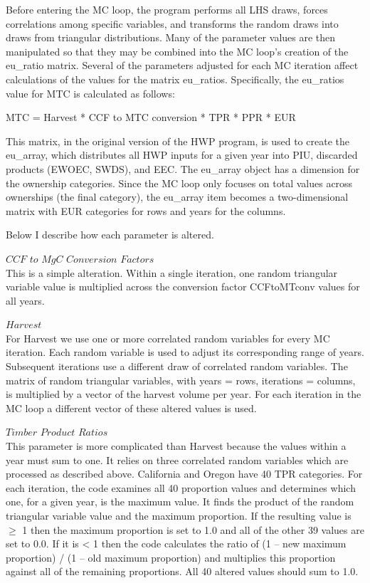 \documentclass[
  openany]{book}
\begin{document}
Before entering the MC loop, the program performs all LHS draws, forces
correlations among specific variables, and transforms the random draws
into draws from triangular distributions. Many of the parameter values
are then manipulated so that they may be combined into the MC loop's
creation of the eu\_ratio matrix. Several of the parameters adjusted for
each MC iteration affect calculations of the values for the matrix
eu\_ratios. Specifically, the eu\_ratios value for MTC is calculated as
follows:

MTC = Harvest * CCF to MTC conversion * TPR * PPR * EUR

This matrix, in the original version of the HWP program, is used to
create the eu\_array, which distributes all HWP inputs for a given year
into PIU, discarded products (EWOEC, SWDS), and EEC. The eu\_array
object has a dimension for the ownership categories. Since the MC loop
only focuses on total values across ownerships (the final category), the
eu\_array item becomes a two-dimensional matrix with EUR categories for
rows and years for the columns.

Below I describe how each parameter is altered.

\(\textit{CCF to MgC Conversion Factors}\)\\
This is a simple alteration. Within a single iteration, one random
triangular variable value is multiplied across the conversion factor
CCFtoMTconv values for all years.

\(\textit{Harvest}\)\\
For Harvest we use one or more correlated random variables for every MC
iteration. Each random variable is used to adjust its corresponding
range of years. Subsequent iterations use a different draw of correlated
random variables. The matrix of random triangular variables, with years
= rows, iterations = columns, is multiplied by a vector of the harvest
volume per year. For each iteration in the MC loop a different vector of
these altered values is used.

\(\textit{Timber Product Ratios}\)\\
This parameter is more complicated than Harvest because the values
within a year must sum to one. It relies on three correlated random
variables which are processed as described above. California and Oregon
have 40 TPR categories. For each iteration, the code examines all 40
proportion values and determines which one, for a given year, is the
maximum value. It finds the product of the random triangular variable
value and the maximum proportion. If the resulting value is \(\geq\) 1
then the maximum proportion is set to 1.0 and all of the other 39 values
are set to 0.0. If it is \textless{} 1 then the code calculates the
ratio of (1 -- new maximum proportion) / (1 -- old maximum proportion)
and multiplies this proportion against all of the remaining proportions.
All 40 altered values should sum to 1.0.
\end{document}
